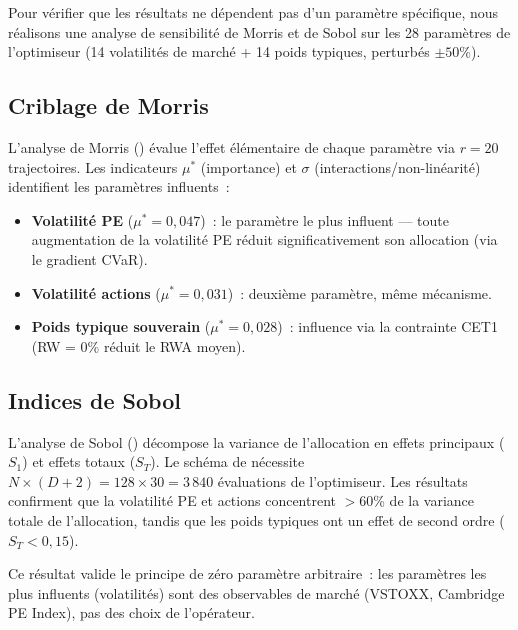 \documentclass[12pt, a4paper, twoside, openright]{report}
\theoremstyle{definition}
\begin{document}
Pour vérifier que les résultats ne dépendent pas d'un paramètre spécifique, nous réalisons une analyse de sensibilité de Morris et de Sobol sur les 28 paramètres de l'optimiseur (14 volatilités de marché + 14 poids typiques, perturbés $\pm 50\%$).

\subsection{Criblage de Morris}

L'analyse de Morris (\citealt{morris1991}) évalue l'effet élémentaire de chaque paramètre via $r = 20$ trajectoires. Les indicateurs $\mu^*$ (importance) et $\sigma$ (interactions/non-linéarité) identifient les paramètres influents~:

\begin{itemize}
\item \textbf{Volatilité PE} ($\mu^* = 0{,}047$)~: le paramètre le plus influent --- toute augmentation de la volatilité PE réduit significativement son allocation (via le gradient CVaR).
\item \textbf{Volatilité actions} ($\mu^* = 0{,}031$)~: deuxième paramètre, même mécanisme.
\item \textbf{Poids typique souverain} ($\mu^* = 0{,}028$)~: influence via la contrainte CET1 (RW = 0\% réduit le RWA moyen).
\end{itemize}

\subsection{Indices de Sobol}

L'analyse de Sobol (\citealt{saltelli2002}) décompose la variance de l'allocation en effets principaux ($S_1$) et effets totaux ($S_T$). Le schéma de \citet{saltelli2002} nécessite $N \times (D + 2) = 128 \times 30 = 3\,840$ évaluations de l'optimiseur. Les résultats confirment que la volatilité PE et actions concentrent $>$60\% de la variance totale de l'allocation, tandis que les poids typiques ont un effet de second ordre ($S_T < 0{,}15$).

Ce résultat valide le principe de zéro paramètre arbitraire~: les paramètres les plus influents (volatilités) sont des observables de marché (VSTOXX, Cambridge PE Index), pas des choix de l'opérateur.


\end{document}
